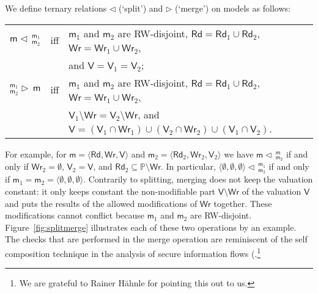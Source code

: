 \documentclass{llncs}
\newcommand{\modl}{\mathsf m}
\newcommand{\mrg}[3]{ ^{#2}_{#3} \triangleright \, #1 }
\newcommand{\splt}[3]{ #1 \triangleleft \, ^{#2}_{#3} }
\newcommand{\readset}{\mathsf{Rd}}
\newcommand{\valuset}{\mathsf{V}}
\newcommand{\writeset}{\mathsf{Wr}}
\newcommand{\propset}{\mathbb P}
\newcommand{\tuple}[1]{ \langle #1 \rangle}
\begin{document}
We define ternary relations $\triangleleft$ (`split') and $\triangleright$ (`merge') on models as follows:
\begin{center}\begin{tabular}{lll}
$\splt{\modl}{\modl_1} {\modl_2} $ & iff & $\modl_1$ and $\modl_2$ are RW-disjoint, 
$\readset = \readset_1 \cup \readset_2 $, $\writeset = \writeset_1 \cup \writeset_2$,  \\&&  and $\valuset = \valuset_1 = \valuset_2$;
\\
$\mrg{\modl}{\modl_1} {\modl_2} $ & iff  & $\modl_1$ and $\modl_2$ are RW-disjoint, 
$\readset = \readset_1 \cup \readset_2$, $\writeset = \writeset_1 \cup \writeset_2$,  \\&&
$\valuset_1 \setminus \writeset = \valuset_2 \setminus \writeset $, and 
$\valuset = (\valuset_1 \cap \writeset_1) \cup (\valuset_2 \cap \writeset_2) \cup (\valuset_1 \cap \valuset_2) $. 
\end{tabular}\end{center}
For example, for 
$\modl = \tuple{ \readset,\writeset,\valuset }$ and 
$\modl_2 = \tuple{ \readset_2,\writeset_2,\valuset_2 }$ 
we have $\splt{\modl}{\modl} {\modl_2} $ if and only if
$\writeset_2 = \emptyset$, $\valuset_2 = \valuset$, and
$\readset_2 \subseteq \propset \setminus \writeset$.
In particular, 
$\splt{ \tuple{\emptyset,\emptyset,\emptyset} }{\modl_1}{\modl_2}$ if and only if 
$\modl_1 = \modl_2 = \tuple{\emptyset,\emptyset,\emptyset}$. 
%
Contrarily to splitting, merging does not keep the valuation constant: 
it only keeps constant the non-modifiable part $\valuset \setminus \writeset$ of the valuation $\valuset $ and 
puts the results of the allowed modifications of $\writeset$ together. 
These modifications cannot conflict because $\modl_1$ and $\modl_2 $ are RW-disjoint. 
Figure~\ref{fig:splitmerge} illustrates each of these two operations by an example. 
%
The checks that are performed in the merge operation are reminiscent of the self composition technique in the analysis of secure information flows (\cite{DarvasEtal05,Scheben2016}.\footnote{%
We are grateful to Rainer H\"ahnle for pointing this out to us. 
}
\end{document}
